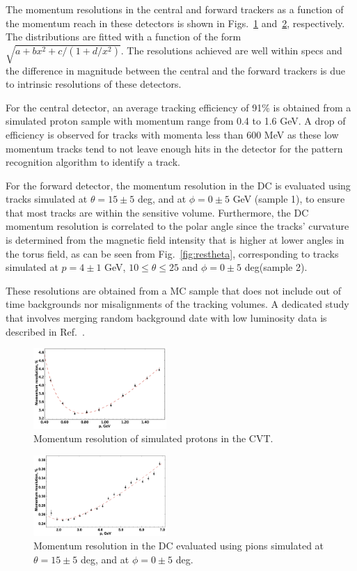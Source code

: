 The momentum resolutions in the central and forward trackers as a function of the momentum reach
in these detectors is shown in Figs.~\ref{fig:respcvt} and~\ref{fig:respdc}, respectively.  The distributions are fitted with a function of the form $\sqrt{a+b x^{2}+c/(1+d/x^{2})}$.  The resolutions achieved are well within specs and the difference in magnitude between the central and the forward trackers is due to intrinsic resolutions of these detectors. 

For the central detector, an average tracking efficiency of 91\% is obtained from a simulated proton sample with momentum range from 0.4 to 1.6 GeV.  A drop of efficiency is observed for tracks with momenta less than 600 MeV as these low momentum tracks tend to not leave enough hits in the detector for the pattern recognition algorithm to identify a track.  

For the forward detector, the momentum resolution in the DC is evaluated using  tracks simulated at $\theta =15\pm 5$ deg, and at $\phi = 0 \pm 5$ GeV (sample 1), to ensure that most tracks are within the sensitive volume.
Furthermore, the DC momentum resolution is correlated to the polar angle since the tracks' curvature is determined from the magnetic field intensity that is higher at lower angles in the torus field, as can be seen from Fig.~\ref{fig:restheta}, corresponding to tracks simulated at $p=4\pm 1$ GeV, $10\leq \theta\leq 25$ and $\phi = 0 \pm 5$ deg(sample 2).

These resolutions are obtained from a MC sample that does not include out of time backgrounds nor misalignments of the tracking volumes.   
A dedicated study that involves merging random background date with low luminosity data is described in Ref.~\cite{clas12-nim}.

\begin{figure}
\includegraphics[width=0.45\textwidth]{pics/fddegipekmpjjiho.png}
\caption{Momentum resolution of simulated protons in the CVT.  
}
\label{fig:respcvt}
\end{figure}
\begin{figure}
\includegraphics[width=0.45\textwidth]{pics/DCRes.png}
\caption{Momentum resolution in the DC evaluated using pions  simulated at $\theta =15\pm 5$ deg, and at $\phi = 0 \pm 5$ deg.
}
\label{fig:respdc}
\end{figure}

